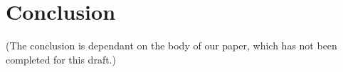 \section{Conclusion}
(The conclusion is dependant on the body of our paper, which has not been completed for this draft.)
